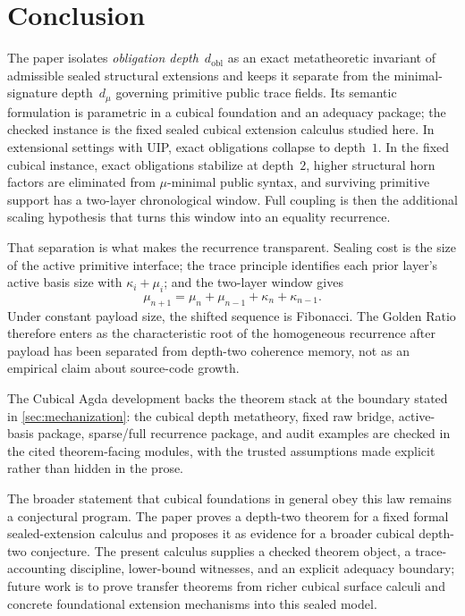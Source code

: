 \documentclass{lmcs}
\begin{document}
\section{Conclusion}
\label{sec:conclusion}

The paper isolates \emph{obligation depth}~$d_{\mathrm{obl}}$ as an exact
metatheoretic invariant of admissible sealed structural extensions and keeps it
separate from the minimal-signature depth~$d_\mu$ governing primitive public
trace fields. Its semantic formulation is parametric in a cubical foundation
and an adequacy package; the checked instance is the fixed sealed cubical
extension calculus studied here. In extensional settings with UIP, exact
obligations collapse to depth~$1$. In the fixed cubical instance, exact
obligations stabilize at depth~$2$, higher structural horn factors are
eliminated from $\mu$-minimal public syntax, and surviving primitive support has
a two-layer chronological window. Full coupling is then the additional scaling
hypothesis that turns this window into an equality recurrence.

That separation is what makes the recurrence transparent. Sealing cost is the
size of the active primitive interface; the trace principle identifies each prior
layer's active basis size with $\kappa_i+\mu_i$; and the two-layer window gives
\[
  \mu_{n+1}=\mu_n+\mu_{n-1}+\kappa_n+\kappa_{n-1}.
\]
Under constant payload size, the shifted sequence is Fibonacci. The Golden Ratio
therefore enters as the characteristic root of the homogeneous recurrence after
payload has been separated from depth-two coherence memory, not as an empirical
claim about source-code growth.

The Cubical Agda development backs the theorem stack at the boundary stated in
\autoref{sec:mechanization}: the cubical depth metatheory, fixed raw bridge,
active-basis package, sparse/full recurrence package, and audit examples are
checked in the cited theorem-facing modules, with the trusted assumptions made
explicit rather than hidden in the prose.

The broader statement that cubical foundations in general obey this law remains
a conjectural program. The paper proves a depth-two theorem for a fixed formal
sealed-extension calculus and proposes it as evidence for a broader cubical
depth-two conjecture. The present calculus supplies a checked theorem object, a
trace-accounting discipline, lower-bound witnesses, and an explicit adequacy
boundary; future work is to prove transfer theorems from richer cubical surface
calculi and concrete foundational extension mechanisms into this sealed model.



\end{document}
